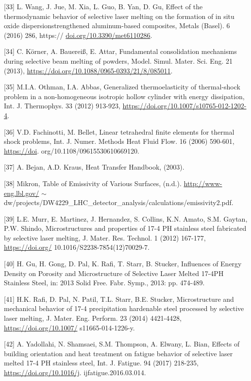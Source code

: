 \documentclass[10pt]{article}
\begin{document}
[33] L. Wang, J. Jue, M. Xia, L. Guo, B. Yan, D. Gu, Effect of the thermodynamic behavior of selective laser melting on the formation of in situ oxide dispersionstrengthened aluminum-based composites, Metals (Basel). 6 (2016) 286, https:// \href{http://doi.org/10.3390/met6110286}{doi.org/10.3390/met6110286}.

[34] C. Körner, A. Bauereiß, E. Attar, Fundamental consolidation mechanisms during selective beam melting of powders, Model. Simul. Mater. Sci. Eng. 21 (2013), \href{https://doi.org/10.1088/0965-0393/21/8/085011}{https://doi.org/10.1088/0965-0393/21/8/085011}.

[35] M.I.A. Othman, I.A. Abbas, Generalized thermoelasticity of thermal-shock problem in a non-homogeneous isotropic hollow cylinder with energy dissipation, Int. J. Thermophys. 33 (2012) 913-923, \href{https://doi.org/10.1007/s10765-012-1202-4}{https://doi.org/10.1007/s10765-012-1202-4}.

[36] V.D. Fachinotti, M. Bellet, Linear tetrahedral finite elements for thermal shock problems, Int. J. Numer. Methods Heat Fluid Flow. 16 (2006) 590-601, \href{https://doi}{https://doi}. org/10.1108/09615530610669120.

[37] A. Bejan, A.D. Kraus, Heat Transfer Handbook, (2003).

[38] Mikron, Table of Emissivity of Various Surfaces, (n.d.). \href{http://www-eng.lbl.gov/}{http://www-eng.lbl.gov/} $\sim$ dw/projects/DW4229\_LHC\_detector\_analysis/calculations/emissivity2.pdf.

[39] L.E. Murr, E. Martinez, J. Hernandez, S. Collins, K.N. Amato, S.M. Gaytan, P.W. Shindo, Microstructures and properties of 17-4 PH stainless steel fabricated by selective laser melting, J. Mater. Res. Technol. 1 (2012) 167-177, \href{https://doi.org/}{https://doi.org/} 10.1016/S2238-7854(12)70029-7.

[40] H. Gu, H. Gong, D. Pal, K. Rafi, T. Starr, B. Stucker, Influences of Energy Density on Porosity and Microstructure of Selective Laser Melted 17-4PH Stainless Steel, in: 2013 Solid Free. Fabr. Symp., 2013: pp. 474-489.

[41] H.K. Rafi, D. Pal, N. Patil, T.L. Starr, B.E. Stucker, Microstructure and mechanical behavior of 17-4 precipitation hardenable steel processed by selective laser melting, J. Mater. Eng. Perform. 23 (2014) 4421-4428, \href{https://doi.org/10.1007/}{https://doi.org/10.1007/} s11665-014-1226-y.

[42] A. Yadollahi, N. Shamsaei, S.M. Thompson, A. Elwany, L. Bian, Effects of building orientation and heat treatment on fatigue behavior of selective laser melted 17-4 PH stainless steel, Int. J. Fatigue. 94 (2017) 218-235, \href{https://doi.org/10.1016/j}{https://doi.org/10.1016/j}. ijfatigue.2016.03.014.
\end{document}
